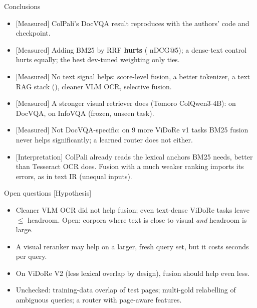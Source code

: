 \documentclass[aspectratio=169,11pt]{beamer}
\newcommand{\lbl}[2]{\textsf{\scriptsize\textcolor{#1}{[#2]}}}
\newcommand{\Mea}{\lbl{bgAqua}{Measured}}
\newcommand{\Int}{\lbl{tagI}{Interpretation}}
\newcommand{\Hyp}{\lbl{tagH}{Hypothesis}}
\begin{document}
\begin{frame}{Conclusions}
\begin{itemize}
  \item \Mea{} ColPali's DocVQA result reproduces with the authors' code and checkpoint.
  \item \Mea{} Adding BM25 by RRF \textbf{hurts} (\deltaC{} nDCG@5); a dense-text control hurts equally; the best dev-tuned weighting only ties.
  \item \Mea{} No text signal helps: score-level fusion, a better tokenizer, a text RAG stack (\deltaTrr{}), cleaner VLM OCR, selective fusion.
  \item \Mea{} A stronger visual retriever does (Tomoro ColQwen3-4B): \deltaTM{} on DocVQA, \infoDelta{} on InfoVQA (frozen, unseen task).
  \item \Mea{} Not DocVQA-specific: on 9 more ViDoRe v1 tasks BM25 fusion never helps significantly; a learned router does not either.
  \item \Int{} ColPali already reads the lexical anchors BM25 needs, better than Tesseract OCR does. Fusion with a much weaker ranking imports its errors, as in text IR (unequal inputs).
\end{itemize}
\end{frame}

\begin{frame}{Open questions}
\Hyp{}
\begin{itemize}
  \item Cleaner VLM OCR did not help fusion; even text-dense ViDoRe tasks leave $\le$\pfMaxHead{} headroom. Open: corpora where text is close to visual \emph{and} headroom is large.
  \item A visual reranker may help on a larger, fresh query set, but it costs seconds per query.
  \item On ViDoRe V2 (less lexical overlap by design), fusion should help even less.
  \item Unchecked: training-data overlap of test pages; multi-gold relabelling of ambiguous queries; a router with page-aware features.
\end{itemize}
\end{frame}
\end{document}

